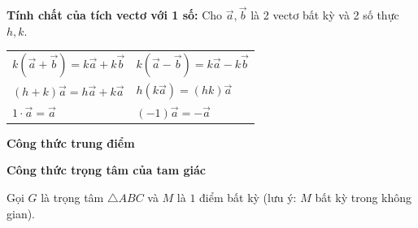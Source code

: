 \documentclass[12pt,a4paper]{extarticle}
\begin{document}
    \item \textbf{Tính chất của tích vectơ với 1 số:} Cho $\vec{a}, \vec{b}$ là 2 vectơ bất kỳ và 2 số thực $h, k$.
    \begin{center}
        \begin{tabular}{ll}
            $k(\vec{a} + \vec{b}) = k\vec{a} + k\vec{b}$ & $k(\vec{a} - \vec{b}) = k\vec{a} - k\vec{b}$ \\[0.3em]
            $(h + k)\vec{a} = h\vec{a} + k\vec{a}$ & $h(k\vec{a}) = (hk)\vec{a}$ \\[0.3em]
            $1 \cdot \vec{a} = \vec{a}$ & $(-1)\vec{a} = -\vec{a}$
        \end{tabular}
    \end{center}

    \item \textbf{Công thức trung điểm}
    \begin{center}
    \end{center}
    \item \textbf{Công thức trọng tâm của tam giác}
    \par Gọi $G$ là trọng tâm $\triangle ABC$ và $M$ là $1$ điểm bất kỳ (lưu ý: $M$ bất kỳ trong không gian).
\end{document}
